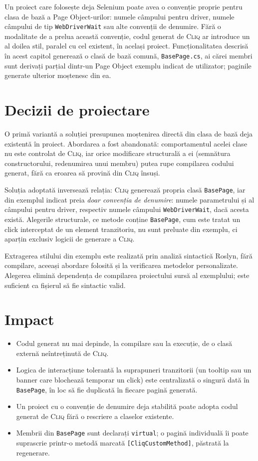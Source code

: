 \documentclass[12pt,a4paper]{report}
\newcommand{\File}[1]{\nolinkurl{#1}}
\newcommand{\Cliq}{\textsc{Cliq}}
\begin{document}
Un proiect care folosește deja Selenium poate avea o convenție proprie pentru clasa de bază a Page Object-urilor: numele câmpului pentru driver, numele câmpului de tip \File{WebDriverWait} sau alte convenții de denumire. Fără o modalitate de a prelua această convenție, codul generat de \Cliq{} ar introduce un al doilea stil, paralel cu cel existent, în același proiect. Funcționalitatea descrisă în acest capitol generează o clasă de bază comună, \File{BasePage.cs}, ai cărei membri sunt derivați parțial dintr-un Page Object exemplu indicat de utilizator; paginile generate ulterior moștenesc din ea.

\section{Decizii de proiectare}

O primă variantă a soluției presupunea moștenirea directă din clasa de bază deja existentă în proiect. Abordarea a fost abandonată: comportamentul acelei clase nu este controlat de \Cliq{}, iar orice modificare structurală a ei (semnătura constructorului, redenumirea unui membru) putea rupe compilarea codului generat, fără ca eroarea să provină din \Cliq{} însuși.

Soluția adoptată inversează relația: \Cliq{} generează propria clasă \File{BasePage}, iar din exemplul indicat preia \emph{doar convenția de denumire}: numele parametrului și al câmpului pentru driver, respectiv numele câmpului \File{WebDriverWait}, dacă acesta există. Alegerile structurale, ce metode conține \File{BasePage}, cum este tratat un click interceptat de un element tranzitoriu, nu sunt preluate din exemplu, ci aparțin exclusiv logicii de generare a \Cliq{}.

Extragerea stilului din exemplu este realizată prin analiză sintactică Roslyn, fără compilare, aceeași abordare folosită și la verificarea metodelor personalizate. Alegerea elimină dependența de compilarea proiectului sursă al exemplului; este suficient ca fișierul să fie sintactic valid.

\section{Impact}

\begin{itemize}
  \item Codul generat nu mai depinde, la compilare sau la execuție, de o clasă externă neîntreținută de \Cliq{}.
  \item Logica de interacțiune tolerantă la suprapuneri tranzitorii (un tooltip sau un banner care blochează temporar un click) este centralizată o singură dată în \File{BasePage}, în loc să fie duplicată în fiecare pagină generată.
  \item Un proiect cu o convenție de denumire deja stabilită poate adopta codul generat de \Cliq{} fără o rescriere a claselor existente.
  \item Membrii din \File{BasePage} sunt declarați \File{virtual}; o pagină individuală îi poate suprascrie printr-o metodă marcată \File{[CliqCustomMethod]}, păstrată la regenerare.
\end{itemize}
\end{document}
